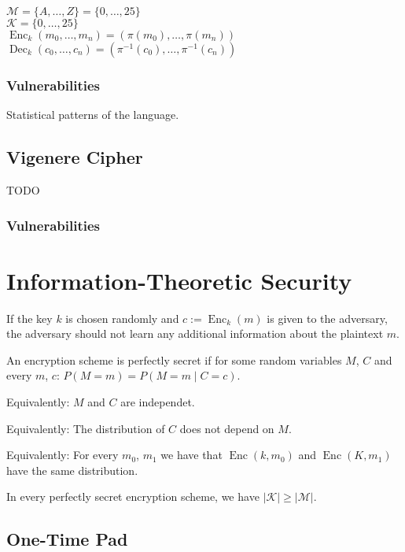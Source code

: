 \documentclass[11pt]{article}
\DeclareMathOperator{\Enc}{Enc}
\DeclareMathOperator{\Dec}{Dec}
\begin{document}
    $\mathcal{M} = \{A, \dotsc, Z\} = \{0, \dotsc, 25\}$\\
    $\mathcal{K} = \{0, \dotsc, 25\}$\\
    $\Enc_k(m_0, \dotsc, m_n) = (\pi(m_0), \dotsc, \pi(m_n))$\\
    $\Dec_k(c_0, \dotsc, c_n) = (\pi^{-1}(c_0), \dotsc, \pi^{-1}(c_n))$

    \subsubsection{Vulnerabilities}

    Statistical patterns of the language.

    \subsection{Vigenere Cipher}

    TODO

    \subsubsection{Vulnerabilities}

    \section{Information-Theoretic Security}

    If the key $k$ is chosen randomly and $c := \Enc_k(m)$ is given
    to the adversary, the adversary should not learn any additional
    information about the plaintext $m$.

    An encryption scheme is perfectly secret if for some random variables $M$, $C$
    and every $m$, $c$: $P(M = m) = P(M = m \mid C = c)$.
    
    Equivalently: $M$ and $C$ are independet.

    Equivalently: The distribution of $C$ does not depend on $M$.
    
    Equivalently: For every $m_0$, $m_1$ we have that $\Enc(k, m_0)$ and
    $\Enc(K, m_1)$ have the same distribution.

    In every perfectly secret encryption scheme, we have $|\mathcal{K}| \geq |\mathcal{M}|$.

    \subsection{One-Time Pad}
\end{document}
